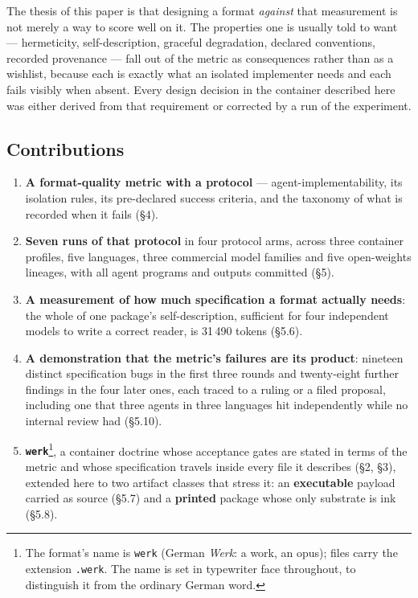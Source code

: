 \documentclass[10pt,twocolumn,letterpaper]{article}
\newcommand{\code}[1]{\texttt{\small #1}}
\begin{document}
The thesis of this paper is that designing a format \emph{against} that measurement is not merely a way to score well on it. The properties one is usually told to want --- hermeticity, self-description, graceful degradation, declared conventions, recorded provenance --- fall out of the metric as consequences rather than as a wishlist, because each is exactly what an isolated implementer needs and each fails visibly when absent. Every design decision in the container described here was either derived from that requirement or corrected by a run of the experiment.

\subsection{Contributions}

\begin{enumerate}[leftmargin=1.2em,itemsep=1pt,topsep=2pt]
\item \textbf{A format-quality metric with a protocol} --- agent-implementability, its isolation rules, its pre-declared success criteria, and the taxonomy of what is recorded when it fails (\S4).
\item \textbf{Seven runs of that protocol} in four protocol arms, across three container profiles, five languages, three commercial model families and five open-weights lineages, with all agent programs and outputs committed (\S5).
\item \textbf{A measurement of how much specification a format actually needs}: the whole of one package's self-description, sufficient for four independent models to write a correct reader, is 31\,490 tokens (\S5.6).
\item \textbf{A demonstration that the metric's failures are its product}: nineteen distinct specification bugs in the first three rounds and twenty-eight further findings in the four later ones, each traced to a ruling or a filed proposal, including one that three agents in three languages hit independently while no internal review had (\S5.10).
\item \textbf{\code{werk}}\footnote{The format's name is \code{werk} (German \emph{Werk}: a work, an opus); files carry the extension \code{.werk}. The name is set in typewriter face throughout, to distinguish it from the ordinary German word.}, a container doctrine whose acceptance gates are stated in terms of the metric and whose specification travels inside every file it describes (\S2, \S3), extended here to two artifact classes that stress it: an \textbf{executable} payload carried as source (\S5.7) and a \textbf{printed} package whose only substrate is ink (\S5.8).

\end{enumerate}
\end{document}
